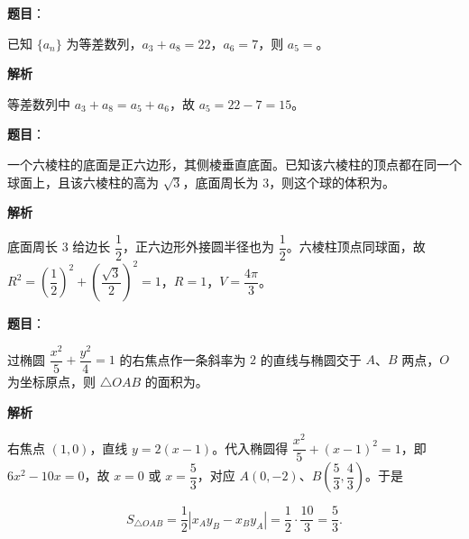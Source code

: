 \begin{answer}

\textbf{题目}：

已知 $\{a_n\}$ 为等差数列，$a_3+a_8=22$，$a_6=7$，则 $a_5=$\gkblank{}。

\textbf{解析}

等差数列中 $a_3+a_8=a_5+a_6$，故 $a_5=22-7=15$。


\end{answer}
\begin{answer}

\textbf{题目}：

一个六棱柱的底面是正六边形，其侧棱垂直底面。已知该六棱柱的顶点都在同一个球面上，且该六棱柱的高为 $\sqrt3$，底面周长为 $3$，则这个球的体积为\gkblank{}。

\textbf{解析}

底面周长 $3$ 给边长 $\dfrac12$，正六边形外接圆半径也为 $\dfrac12$。六棱柱顶点同球面，故 $R^2=\left(\dfrac12\right)^2+\left(\dfrac{\sqrt3}2\right)^2=1$，$R=1$，$V=\dfrac{4\pi}3$。


\end{answer}
\begin{answer}

\textbf{题目}：

过椭圆 $\dfrac{x^2}5+\dfrac{y^2}4=1$ 的右焦点作一条斜率为 $2$ 的直线与椭圆交于 $A$、$B$ 两点，$O$ 为坐标原点，则 $\triangle OAB$ 的面积为\gkblank{}。

\textbf{解析}

右焦点 $(1,0)$，直线 $y=2(x-1)$。代入椭圆得 $\dfrac{x^2}5+(x-1)^2=1$，即 $6x^2-10x=0$，故 $x=0$ 或 $x=\dfrac53$，对应 $A(0,-2)$、$B\left(\dfrac53,\dfrac43\right)$。于是

\nopagebreak[4]
\[S_{\triangle OAB}=\frac12\left|x_Ay_B-x_By_A\right|=\frac12\cdot\frac{10}3=\frac53.\]


\end{answer}
